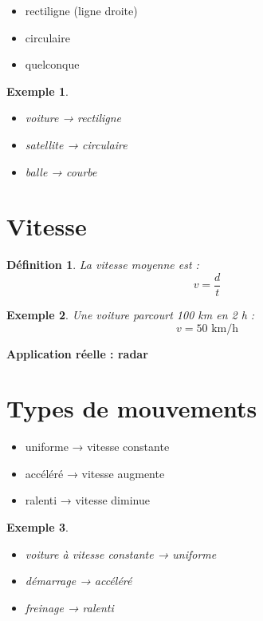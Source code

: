 \documentclass[11pt,a4paper]{article}
\newtheorem{definition}{Définition}
\newtheorem{example}{Exemple}
\begin{document}
\begin{itemize}
\item rectiligne (ligne droite)
\item circulaire
\item quelconque
\end{itemize}

\begin{example}
\begin{itemize}
\item voiture → rectiligne
\item satellite → circulaire
\item balle → courbe
\end{itemize}
\end{example}

\section{Vitesse}

\begin{definition}
La vitesse moyenne est :
\[
v = \frac{d}{t}
\]
\end{definition}

\begin{example}
Une voiture parcourt 100 km en 2 h :
\[
v = 50 \text{ km/h}
\]
\end{example}

\textbf{Application réelle : radar}

\section{Types de mouvements}

\begin{itemize}
\item uniforme → vitesse constante
\item accéléré → vitesse augmente
\item ralenti → vitesse diminue
\end{itemize}

\begin{example}
\begin{itemize}
\item voiture à vitesse constante → uniforme
\item démarrage → accéléré
\item freinage → ralenti
\end{itemize}
\end{example}
\end{document}
